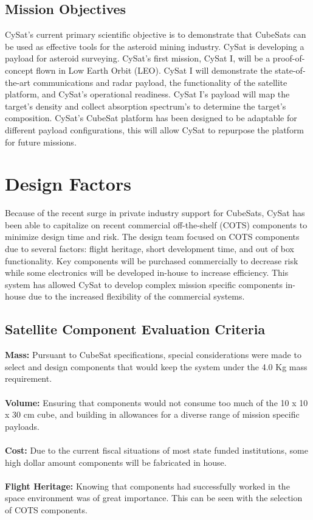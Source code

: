 \documentclass[nocover]            %
{CSLI}                       %
\begin{document}
\subsection{Mission Objectives}
CySat's current primary scientific objective is to demonstrate that CubeSats can be used as effective tools for the asteroid mining industry. CySat is developing a payload for asteroid surveying. CySat's first mission, CySat I, will be a proof-of-concept flown in Low Earth Orbit (LEO). CySat I will demonstrate the state-of-the-art communications and radar payload, the functionality of the satellite platform, and CySat's operational readiness. CySat I's payload will map the target's density and collect absorption spectrum's to determine the target's composition. CySat's CubeSat platform has been designed to be adaptable for different payload configurations, this will allow CySat to repurpose the platform for future missions.

\section{Design Factors}
Because of the recent surge in private industry support for CubeSats, CySat has been able to capitalize on recent commercial off-the-shelf (COTS) components to minimize design time and risk. The design team focused on COTS components due to several factors: flight heritage, short development time, and out of box functionality. Key components will be purchased commercially to decrease risk while some electronics will be developed in-house to increase efficiency. This system has allowed CySat to develop complex mission specific components in-house due to the increased flexibility of the commercial systems.
\subsection{Satellite Component Evaluation Criteria}
\textbf{Mass:} Pursuant to CubeSat specifications, special considerations were made to select and design components that would keep the system under the 4.0 Kg mass requirement.\\
\\\textbf{Volume:} Ensuring that components would not consume too much of the 10 x 10 x 30 cm cube, and building in allowances for a diverse range of mission specific payloads. \\
\\\textbf{Cost:} Due to the current fiscal situations of most state funded institutions, some high dollar amount components will be fabricated in house. \\
\\\textbf{Flight Heritage:} Knowing that components had successfully worked in the space environment was of great importance. This can be seen with the selection of COTS components.\\
\end{document}
